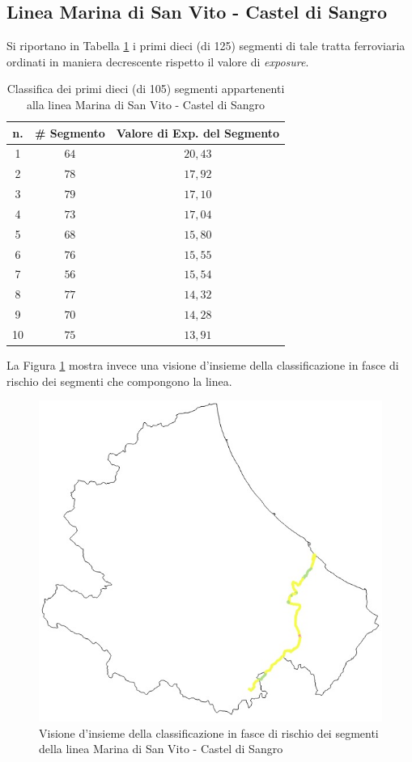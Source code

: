 \subsection{Linea Marina di San Vito - Castel di Sangro}
Si riportano in Tabella \ref{classificamarinadisanvitocasteldisangro} i primi dieci (di 125) segmenti di tale tratta ferroviaria ordinati in maniera decrescente rispetto il valore di \textit{exposure}.
\begin{table}[h]
\centering
\begin{tabular}{|c|c|c|}
\hline
\rowcolor{lightgray}
n. & \# Segmento & Valore di Exp. del Segmento \\ \hline \rowcolor{flamingopink}
1  & $64$        & $20,43$                      \\ \hline \rowcolor{icterine}
2  & $78$        & $17,92$                      \\ \hline \rowcolor{icterine}
3  & $79$        & $17,10$                      \\ \hline \rowcolor{icterine}
4  & $73$        & $17,04$                      \\ \hline \rowcolor{icterine}
5  & $68$        & $15,80$                      \\ \hline \rowcolor{icterine}
6  & $76$        & $15,55$                      \\ \hline \rowcolor{icterine}
7  & $56$       & $15,54$                      \\ \hline \rowcolor{icterine}
8  & $77$        & $14,32$                      \\ \hline \rowcolor{icterine}
9  & $70$        & $14,28$                      \\ \hline \rowcolor{icterine}
10 & $75$        & $13,91$                      \\ \hline
\end{tabular}
\caption{Classifica dei primi dieci (di 105) segmenti appartenenti alla linea Marina di San Vito - Castel di Sangro}
\label{classificamarinadisanvitocasteldisangro}
\end{table}
\newline
La Figura \ref{sanvitocasteldisangro} mostra invece una visione d'insieme della classificazione in fasce di rischio dei segmenti che compongono la linea.
\begin{figure}[h]
\centering
\includegraphics[width=0.4\linewidth]{img/sanvitocasteldisangro.jpeg}
\caption{Visione d'insieme della classificazione in fasce di rischio dei segmenti della linea Marina di San Vito - Castel di Sangro}
\label{sanvitocasteldisangro}
\end{figure}
